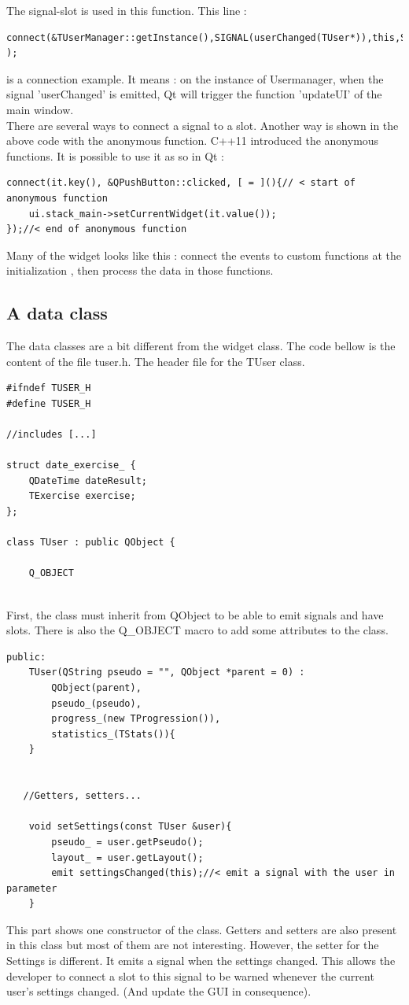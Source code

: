 The signal-slot is used in this function. This line : 
\begin{lstlisting}
connect(&TUserManager::getInstance(),SIGNAL(userChanged(TUser*)),this,SLOT(updateUI(TUser*)) );
\end{lstlisting}
is a connection example. It means : on the instance of Usermanager, when the signal 'userChanged' is emitted, Qt will trigger the function 'updateUI' of the main window.\\
There are several ways to connect a signal to a slot. Another way is shown in the above code with the anonymous function. C++11 introduced the anonymous functions. It is possible to use it as so in Qt :
\begin{lstlisting}
connect(it.key(), &QPushButton::clicked, [ = ](){// < start of anonymous function
	ui.stack_main->setCurrentWidget(it.value());
});//< end of anonymous function
\end{lstlisting}

Many of the widget looks like this : connect the events to custom functions at the initialization , then process the data in those functions.

\subsection{A data class}

The data classes are a bit different from the widget class. The code bellow is the content of the file tuser.h. The header file for the TUser class.
\begin{lstlisting}
#ifndef TUSER_H
#define TUSER_H

//includes [...]

struct date_exercise_ {
    QDateTime dateResult;
    TExercise exercise;
};

class TUser : public QObject {

    Q_OBJECT
    
\end{lstlisting}
First, the class must inherit from QObject to be able to emit signals and have slots. There is also the Q\_OBJECT macro to add some attributes to the class.

\begin{lstlisting}
public:
    TUser(QString pseudo = "", QObject *parent = 0) :
        QObject(parent),
        pseudo_(pseudo),
        progress_(new TProgression()),
        statistics_(TStats()){
    }


   //Getters, setters...

    void setSettings(const TUser &user){
        pseudo_ = user.getPseudo();
        layout_ = user.getLayout();
        emit settingsChanged(this);//< emit a signal with the user in parameter
    }
\end{lstlisting}
This part shows one constructor of the class. Getters and setters are also present in this class but most of them are not interesting. However, the setter for the Settings is different. It emits a signal when the settings changed. This allows the developer to connect a slot to this signal to be warned whenever the current user's settings changed. (And update the GUI in consequence).


